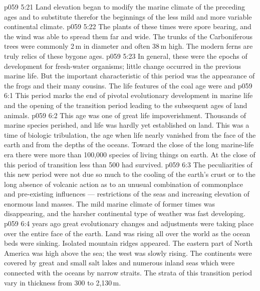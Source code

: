 \vs p059 5:21 Land elevation began to modify the marine climate of the preceding ages and to substitute therefor the beginnings of the less mild and more variable continental climate.
\vs p059 5:22 The plants of these times were spore bearing, and the wind was able to spread them far and wide. The trunks of the Carboniferous trees were commonly 2\,m in diameter and often 38\,m high. The modern ferns are truly relics of these bygone ages.
\vs p059 5:23 In general, these were the epochs of development for fresh\hyp{}water organisms; little change occurred in the previous marine life. But the important characteristic of this period was the  appearance of the frogs and their many cousins. The life features of the coal age were  and 
\vs p059 6:1 This period marks the end of pivotal evolutionary development in marine life and the opening of the transition period leading to the subsequent ages of land animals.
\vs p059 6:2 This age was one of great life impoverishment. Thousands of marine species perished, and life was hardly yet established on land. This was a time of biologic tribulation, the age when life nearly vanished from the face of the earth and from the depths of the oceans. Toward the close of the long marine\hyp{}life era there were more than 100,000 species of living things on earth. At the close of this period of transition less than 500 had survived.
\vs p059 6:3 The peculiarities of this new period were not due so much to the cooling of the earth’s crust or to the long absence of volcanic action as to an unusual combination of commonplace and pre\hyp{}existing influences --- restrictions of the seas and increasing elevation of enormous land masses. The mild marine climate of former times was disappearing, and the harsher continental type of weather was fast developing.
\vs p059 6:4 \pc {} years ago great evolutionary changes and adjustments were taking place over the entire face of the earth. Land was rising all over the world as the ocean beds were sinking. Isolated mountain ridges appeared. The eastern part of North America was high above the sea; the west was slowly rising. The continents were covered by great and small salt lakes and numerous inland seas which were connected with the oceans by narrow straits. The strata of this transition period vary in thickness from 300 to 2,130\,m.
